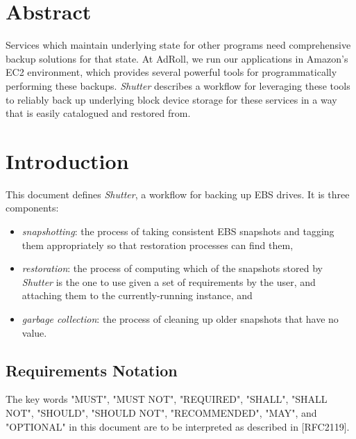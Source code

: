 \documentclass[letter,12pt,x11names]{article}
\begin{document}
\section{Abstract}

Services which maintain underlying state for other programs need comprehensive backup solutions for that state. At AdRoll, we run our applications in Amazon's EC2 environment, which provides several powerful tools for programmatically performing these backups. \emph{Shutter} describes a workflow for leveraging these tools to reliably back up underlying block device storage for these services in a way that is easily catalogued and restored from.

\section{Introduction}
This document defines \emph{Shutter}, a workflow for backing up EBS drives. It is  three components:

\begin{itemize}
\item \emph{snapshotting}: the process of taking consistent EBS snapshots and tagging them appropriately so that restoration processes can find them,
\item \emph{restoration}: the process of computing which of the snapshots stored by \emph{Shutter} is the one to use given a set of requirements by the user, and attaching them to the currently-running instance, and
\item \emph{garbage collection}: the process of cleaning up older snapshots that have no value.
\end{itemize}

\subsection{Requirements Notation}
The key words "MUST", "MUST NOT", "REQUIRED", "SHALL", "SHALL NOT", "SHOULD", "SHOULD NOT", "RECOMMENDED", "MAY", and "OPTIONAL" in this document are to be interpreted as described in [RFC2119].

\newpage
\end{document}
